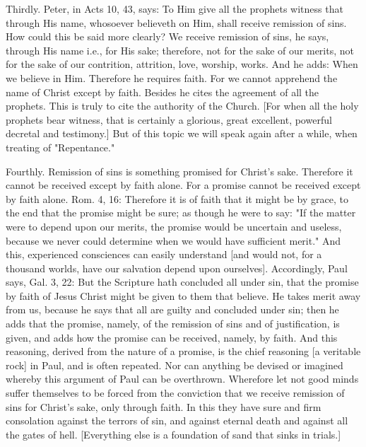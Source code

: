 Thirdly.  Peter, in Acts 10, 43, says: To Him give all the prophets
witness that through His name, whosoever believeth on Him, shall
receive remission of sins.  How could this be said more clearly?  We
receive remission of sins, he says, through His name i.e., for His
sake; therefore, not for the sake of our merits, not for the sake of
our contrition, attrition, love, worship, works.  And he adds: When
we believe in Him.  Therefore he requires faith.  For we cannot
apprehend the name of Christ except by faith.  Besides he cites the
agreement of all the prophets.  This is truly to cite the authority
of the Church.  [For when all the holy prophets bear witness, that is
certainly a glorious, great excellent, powerful decretal and
testimony.] But of this topic we will speak again after a while, when
treating of "Repentance."

Fourthly.  Remission of sins is something promised for Christ's sake.
Therefore it cannot be received except by faith alone.  For a
promise cannot be received except by faith alone.  Rom. 4, 16:
Therefore it is of faith that it might be by grace, to the end that
the promise might be sure; as though he were to say: "If the matter
were to depend upon our merits, the promise would be uncertain and
useless, because we never could determine when we would have
sufficient merit." And this, experienced consciences can easily
understand [and would not, for a thousand worlds, have our salvation
depend upon ourselves].  Accordingly, Paul says, Gal. 3, 22: But the
Scripture hath concluded all under sin, that the promise by faith of
Jesus Christ might be given to them that believe.  He takes merit
away from us, because he says that all are guilty and concluded under
sin; then he adds that the promise, namely, of the remission of sins
and of justification, is given, and adds how the promise can be
received, namely, by faith.  And this reasoning, derived from the
nature of a promise, is the chief reasoning [a veritable rock] in
Paul, and is often repeated.  Nor can anything be devised or imagined
whereby this argument of Paul can be overthrown.  Wherefore let not
good minds suffer themselves to be forced from the conviction that we
receive remission of sins for Christ's sake, only through faith.  In
this they have sure and firm consolation against the terrors of sin,
and against eternal death and against all the gates of hell.
[Everything else is a foundation of sand that sinks in trials.]

